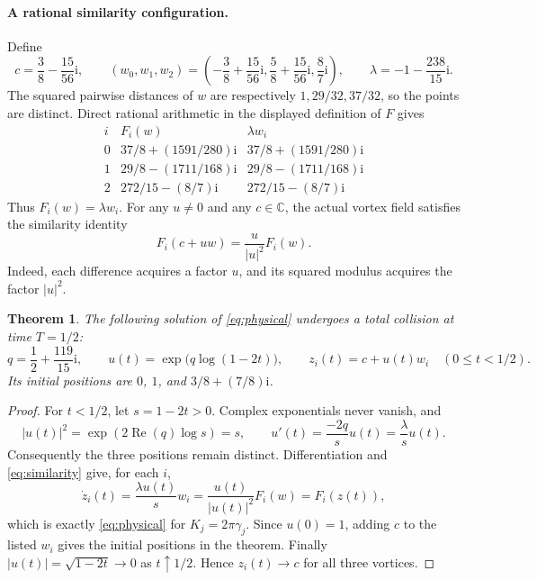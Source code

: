 \documentclass[11pt]{article}
\newtheorem{theorem}{Theorem}
\begin{document}
\paragraph{A rational similarity configuration.}
Define
\[
 c=\frac38-\frac{15}{56}\mathrm i,\qquad
 (w_0,w_1,w_2)=
 \left(-\frac38+\frac{15}{56}\mathrm i,
 \frac58+\frac{15}{56}\mathrm i,\frac87\mathrm i\right),
 \qquad \lambda=-1-\frac{238}{15}\mathrm i.
\]
The squared pairwise distances of $w$ are respectively
$1,29/32,37/32$, so the points are distinct. Direct rational arithmetic
in the displayed definition of $F$ gives
\[
\begin{array}{c|c|c}
i&F_i(w)&\lambda w_i\\\hline
0&37/8+(1591/280)\mathrm i&37/8+(1591/280)\mathrm i\\
1&29/8-(1711/168)\mathrm i&29/8-(1711/168)\mathrm i\\
2&272/15-(8/7)\mathrm i&272/15-(8/7)\mathrm i
\end{array}
\]
Thus $F_i(w)=\lambda w_i$. For any $u\ne0$ and any $c\in\mathbb C$,
the actual vortex field satisfies the similarity identity
\begin{equation}\label{eq:similarity}
 F_i(c+uw)=\frac{u}{|u|^2}F_i(w).
\end{equation}
Indeed, each difference acquires a factor $u$, and its squared modulus
acquires the factor $|u|^2$.

\begin{theorem}
The following solution of \eqref{eq:physical} undergoes a total collision
at time $T=1/2$:
\[
 q=\frac12+\frac{119}{15}\mathrm i,\qquad
 u(t)=\exp\bigl(q\log(1-2t)\bigr),\qquad
 z_i(t)=c+u(t)w_i\quad(0\le t<1/2).
\]
Its initial positions are $0$, $1$, and $3/8+(7/8)\mathrm i$.
\end{theorem}
\begin{proof}
For $t<1/2$, let $s=1-2t>0$. Complex exponentials never vanish, and
\[
 |u(t)|^2=\exp(2\operatorname{Re}(q)\log s)=s,
 \qquad
 u'(t)=\frac{-2q}{s}u(t)=\frac{\lambda}{s}u(t).
\]
Consequently the three positions remain distinct. Differentiation and
\eqref{eq:similarity} give, for each $i$,
\[
 \dot z_i(t)=\frac{\lambda u(t)}s w_i
 =\frac{u(t)}{|u(t)|^2}F_i(w)=F_i(z(t)),
\]
which is exactly \eqref{eq:physical} for $K_j=2\pi\gamma_j$.
Since $u(0)=1$, adding $c$ to the listed $w_i$ gives the initial
positions in the theorem. Finally $|u(t)|=\sqrt{1-2t}\to0$ as
$t\uparrow1/2$. Hence $z_i(t)\to c$ for all three vortices.
\end{proof}
\end{document}
